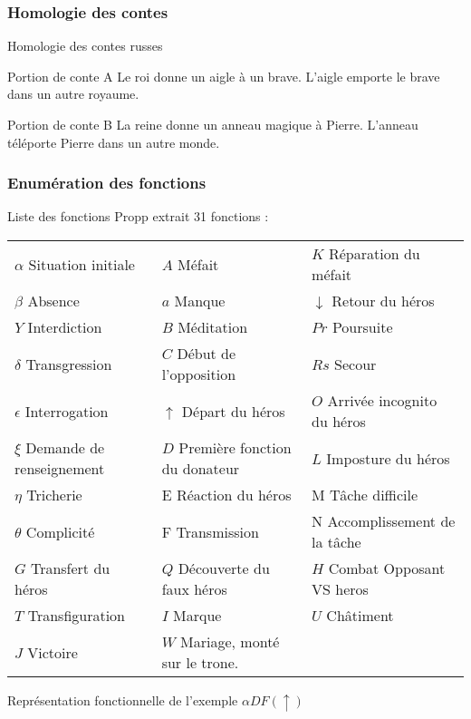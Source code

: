 \documentclass{beamer}
\begin{document}
\subsubsection{Homologie des contes}
\begin{frame}{Homologie des contes russes}
  \begin{block}{Portion de conte A}
   Le roi donne un aigle à un brave. L'aigle emporte le brave dans un autre royaume.
  \end{block}
  \begin{block}{Portion de conte B}
    La reine donne un anneau magique à Pierre. L'anneau téléporte Pierre dans un autre monde.
  \end{block}
\end{frame}

\subsubsection{Enumération des fonctions}
\begin{frame}{Liste des fonctions}
  Propp extrait 31 fonctions : 
  \newline
  \newline
  \tiny
  \begin{tabular}{ l l l }
  $\alpha$ Situation initiale & $A$ Méfait & $K$ Réparation du méfait \\
  $\beta$ Absence & $a$ Manque & $\downarrow$ Retour du héros \\
  $Y$ Interdiction & $B$ Méditation & $Pr$ Poursuite \\
  $\delta$ Transgression  & $C$ Début de l'opposition & $Rs$ Secour \\
  $\epsilon$ Interrogation & $\uparrow$ Départ du héros & $O$ Arrivée incognito du héros \\
  $\xi$ Demande de renseignement & $D$ Première fonction du donateur & $L$ Imposture du héros \\
  $\eta$ Tricherie & E Réaction du héros & M Tâche difficile \\
  $\theta$ Complicité & F Transmission & N Accomplissement de la tâche \\
  $G$ Transfert du héros & $Q$ Découverte du faux héros & $H$ Combat Opposant VS heros \\
  $T$ Transfiguration & $I$ Marque & $U$ Châtiment \\
  $J$ Victoire & $W$ Mariage, monté sur le trone.\\
 \end{tabular}
 \normalsize
 \begin{block}{Représentation fonctionnelle de l'exemple}
   $\alpha D F (\uparrow)$
 \end{block}
\end{frame}
\end{document}
